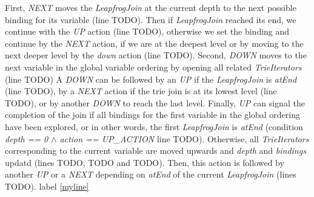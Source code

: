 First, \textit{NEXT} moves the \textit{LeapfrogJoin} at the current depth to the next possible binding for its variable (line TODO). %
Then if \textit{LeapfrogJoin} reached its end, we continue with the \textit{UP} action (line TODO), %
otherwise we set the binding and continue by the \textit{NEXT} action, if we are at the deepest level or by moving
to the next deeper level by the \textit{down} action (line TODO). %
Second, \textit{DOWN} moves to the next variable in the global variable ordering by opening all related \textit{TrieIterators}
(line TODO) %
A \textit{DOWN} can be followed by an \textit{UP} if the \textit{LeapfrogJoin} is \textit{atEnd} (line TODO),
by a \textit{NEXT} action if the trie join is at its lowest level (line TODO), or
by another \textit{DOWN} to reach the last level.
Finally, \textit{UP} can signal the completion of the join if all bindings for the first variable in the global ordering have
been explored, or in other words, the first \textit{LeapfrogJoin} is \textit{atEnd} (condition \textit{depth == 0 $\wedge$ action ==  UP\_ACTION} line TODO). %
Otherwise, all \textit{TrieIterators} corresponding to the current variable are moved upwards
and \textit{depth} and \textit{bindings} updatd (lines TODO, TODO and TODO).  %
Then, this action is followed by another \textit{UP} or a \textit{NEXT} depending on \textit{atEnd} of the current \textit{LeapfrogJoin} (lines TODO). %
label \ref{myline}

